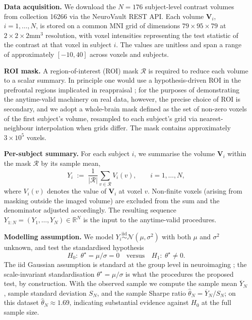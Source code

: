 \documentclass[numsec,webpdf,modern,medium,namedate]{oup-authoring-template}
\theoremstyle{thmstyleone}%
\theoremstyle{thmstyletwo}%
\theoremstyle{thmstylethree}%
\newcommand{\1}{\mathbf{1}}
\begin{document}
\textbf{Data acquisition.}
We download the $N = 176$ subject-level contrast volumes from collection \textsc{16266} via the NeuroVault REST API. Each volume $\mathbf{V}_i$, $i = 1,\ldots,N$, is stored on a common MNI grid of dimensions
$79 \times 95 \times 79$ at $2 \times 2 \times 2 \mathrm{mm}^3$ resolution, with voxel intensities representing the test statistic of the contrast at that voxel in subject $i$. The values are unitless and span a range of
approximately $[-10, 40]$ across voxels and subjects.

\textbf{ROI mask.}
A region-of-interest (ROI) mask $\mathcal{R}$ is required to reduce each volume to a scalar summary. In principle one would use a hypothesis-driven ROI in the prefrontal regions implicated in reappraisal \citep{buhle2014cognitive}; for the purposes of demonstrating the anytime-valid
machinery on real data, however, the precise choice of ROI is secondary, and we adopt a whole-brain mask defined as the set of non-zero voxels of the first subject's volume, resampled to each subject's grid via nearest-
neighbour interpolation when grids differ. The mask contains approximately
$3 \times 10^5$ voxels.

\textbf{Per-subject summary.}
For each subject $i$, we summarise the volume $\mathbf{V}_i$ within the
mask $\mathcal{R}$ by its sample mean,
\begin{equation}
\label{eq:y_obs_def}
  Y_i \;:=\; \frac{1}{|\mathcal{R}|}\sum_{v \in \mathcal{R}} V_i(v),
  \qquad i = 1, \ldots, N,
\end{equation}
where $V_i(v)$ denotes the value of $\mathbf{V}_i$ at voxel $v$. Non-finite
voxels (arising from masking outside the imaged volume) are excluded from
the sum and the denominator adjusted accordingly. The resulting sequence
$Y_{1:N} = (Y_1, \ldots, Y_N) \in \mathbb{R}^N$ is the input to the
anytime-valid procedures.

\textbf{Modelling assumption.}
We model $Y_i \stackrel{\mathrm{iid}}{\sim} \mathcal{N}(\mu, \sigma^2)$
with both $\mu$ and $\sigma^2$ unknown, and test the standardised
hypothesis
\[
  H_0:\; \theta^\star = \mu/\sigma = 0
  \quad\text{versus}\quad
  H_1:\; \theta^\star \neq 0.
\]
The iid Gaussian assumption is standard at the group level in neuroimaging
\cite{penny2012comparing}; the scale-invariant standardisation $\theta^\star =
\mu/\sigma$ is what the procedures the proposed test, by construction. With the observed sample we compute the sample mean $\overline{Y}_N$, sample standard deviation $S_N$, and the sample Sharpe ratio $\widehat\theta_N = \overline{Y}_N / S_N$; on this dataset $\widehat\theta_N \approx 1.69$, indicating substantial evidence against $H_0$ at the full sample size.
\end{document}
